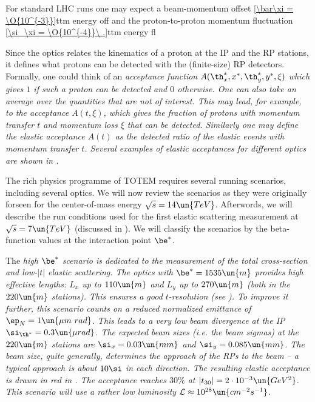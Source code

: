 For standard LHC runs one may expect a beam-momentum offset
\eqref{\bar\xi = \O{10^{-3}}}{ttm energy off}
and the proton-to-proton momentum fluctuation
\eqref{\si_\xi = \O{10^{-4}}\ .}{ttm energy fl}

Since the optics  relates the kinematics of a proton at the IP and the RP stations, it defines what protons can be detected with the (finite-size) RP detectors. Formally, one could think of an \em{acceptance} function $A(\th_x^*, x^*, \th_y^*, y^*, \xi)$ which gives $1$ if such a proton can be detected and $0$ otherwise. One can also take an average over the quantities that are not of interest. This may lead, for example, to the acceptance $A(t, \xi)$, which gives the fraction of protons with momentum transfer $t$ and momentum loss $\xi$ that can be detected. Similarly one may define the \em{elastic acceptance} $A(t)$ as the detected ratio of the elastic events with momentum transfer $t$. Several examples of elastic acceptances for different optics are shown in .



The rich physics programme of TOTEM requires several running scenarios, including several optics. We will now review the scenarios as they were originally forseen for the center-of-mass energy $\sqrt s = 14\un{TeV}$. Afterwords, we will describe the run conditions used for the first elastic scattering measurement at $\sqrt s = 7\un{TeV}$ (discussed in ). We will classify the scenarios by the beta-function values at the interaction point $\be^*$.

\> The \em{high $\be^*$} scenario is dedicated to the measurement of the total cross-section and low-$|t|$ elastic scattering. The optics with $\be^* = 1535\un{m}$ provides high effective lengths: $L_x$ up to $110\un{m}$ and $L_y$ up to $270\un{m}$ (both in the $220\un{m}$ stations). This ensures a good $t$-resolution (see ). To improve it further, this scenario counts on a reduced normalized emittance of $\ep_N=1\un{\mu m\ rad}$. This leads to a very low beam divergence at the IP $\si_{\th^*} = 0.3\un{\mu rad}$. The expected beam sizes (i.e. the beam sigmas) at the $220\un{m}$ stations are $\si_x = 0.03\un{mm}$ and $\si_y = 0.085\un{mm}$. The beam size, quite generally, determines the approach of the RPs to the beam -- a typical approach is about $10\si$ in each direction. The resulting elastic acceptance is drawn in red in . The acceptance reaches $30\percent$ at $|t_{30}| = 2\cdot10^{-3}\un{GeV^2}$. This scenario will use a rather low luminosity ${\cal L} \approx 10^{28} \un{cm^{-2}s^{-1}}$.

